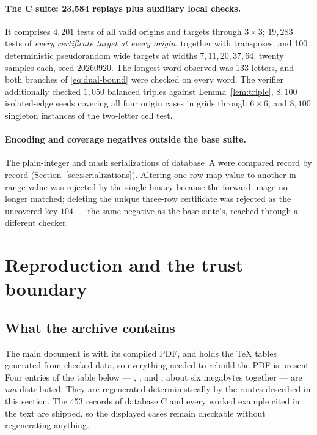 \documentclass[11pt,letterpaper]{article}
\numberwithin{equation}{section}
\theoremstyle{definition}
\theoremstyle{remark}
\newcommand{\code}[1]{\texttt{\detokenize{#1}}}
\newcommand{\dbA}{\textsf{A}}
\newcommand{\dbC}{\textsf{C}}
\begin{document}
\paragraph{The \dbC{} suite: 23,584 replays plus auxiliary local checks.}
It comprises $4{,}201$ tests of all valid origins and targets through
$3\times3$; $19{,}283$ tests of \emph{every certificate target at every
origin}, together with transposes; and 100 deterministic pseudorandom wide
targets at widths $7,11,20,37,64$, twenty samples each, seed $20260920$. The
longest word observed was 133 letters, and both branches of
\eqref{eq:dual-bound} were checked on every word. The verifier additionally
checked $1{,}050$ balanced triples against Lemma~\ref{lem:triple}, $8{,}100$
isolated-edge seeds covering all four origin cases in grids through
$6\times6$, and $8{,}100$ singleton instances of the two-letter cell test.

\paragraph{Encoding and coverage negatives outside the base suite.}
The plain-integer and mask serializations of database~\dbA{} were compared
record by record (Section~\ref{sec:serializations}). Altering one row-map
value to another in-range value was rejected by the single binary because the
forward image no longer matched; deleting the unique three-row certificate
was rejected as the uncovered key $104$ --- the same negative as the base
suite's, reached through a different checker.

\section{Reproduction and the trust boundary}
\label{sec:reproduction}

\subsection{What the archive contains}
The main document is \code{shuffle_six_state.tex} with its compiled PDF, and
\code{tables} holds the TeX tables generated from checked data, so everything
needed to rebuild the PDF is present. Four entries of the table below ---
, ,
 and , about six
megabytes together --- are \emph{not} distributed. They are regenerated
deterministically by the routes described in this section. The 453 records of
database \dbC{} and every worked example cited in the text are shipped, so the
displayed cases remain checkable without regenerating anything.
\end{document}
